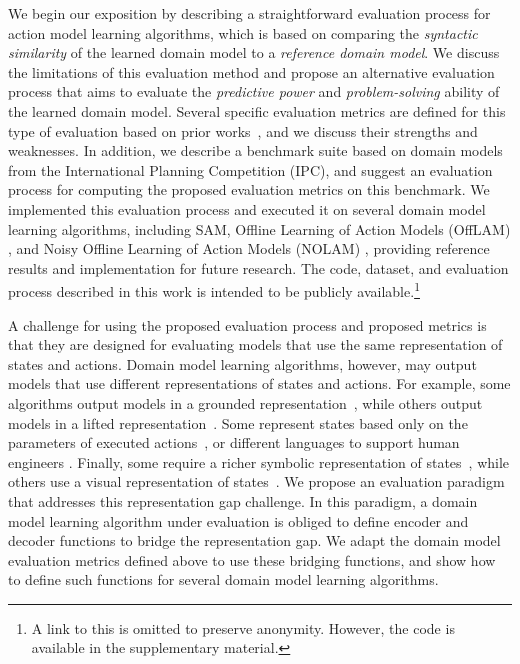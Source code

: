 \documentclass{article}
\theoremstyle{definition}
\theoremstyle{remark}
\newcommand{\sam}{\ac{SAM}\xspace}
\newif\ifaddcomments
\newcommand{\roni}[1]{\ifaddcomments{\textcolor{red}{[Roni: #1]}}\fi}
\begin{document}
We begin our exposition by describing a straightforward evaluation process for action model learning algorithms, which is based on comparing the \emph{syntactic similarity} of the learned domain model to a \emph{reference domain model}. We discuss the limitations of this evaluation method and propose an alternative evaluation process that aims to evaluate the \emph{predictive power} and \emph{problem-solving} ability of the learned domain model. 
Several specific evaluation metrics are defined for this type of evaluation based on prior works~\citep{aineto2019learning,juba2021safe,mordoch2024safe,Oswald2024DLLMDomainModeling}, and we discuss their strengths and weaknesses. 
In addition, we describe a benchmark suite  based on domain models from the International Planning Competition (IPC), 
and suggest an evaluation process for 
computing the proposed evaluation metrics on this benchmark.  
We implemented this evaluation process and executed it on several domain model learning algorithms, including \sam \citep{juba2021safe}, Offline Learning of Action Models (OffLAM) \citep{LAMANNA2025104256}, and Noisy Offline Learning of Action Models (NOLAM) \citep{Lamanna24}, providing reference results and implementation for future research. The code, dataset, and evaluation process described in this work is intended to be publicly available.\footnote{A link to this is omitted to preserve anonymity. However, the code is available in the supplementary material.} 


A challenge for using the proposed evaluation process and proposed metrics is that they are designed for evaluating models that use the same representation of states and actions. 
Domain model learning algorithms, however, may output models that use different representations of states and actions. 
For example, some algorithms output models in a grounded representation~\citep{stern2017efficient}, while others output models in a lifted representation~\citep{juba2021safe,xi2024neuro,LAMANNA2025104256}. 
Some represent states based only on the parameters of executed actions~\citep{cresswell2011generalised}, or different languages to support human engineers \citep{mccluskey2010action}. 
Finally, some require a richer symbolic representation of states~\citep{juba2021safe, Lamanna24}, while others use a visual representation of states~\citep{asai2022classical, xi2024neuro}.
We propose an evaluation paradigm that addresses this representation gap challenge. 
In this paradigm, a domain model learning algorithm under evaluation is obliged to define encoder and decoder functions to bridge the representation gap. 
We adapt the domain model evaluation metrics defined above to use these bridging functions, 
and show how to define such functions for several domain model learning algorithms. 
\end{document}
